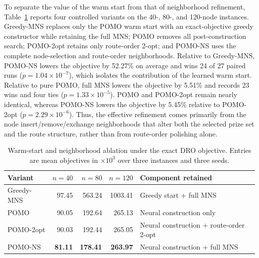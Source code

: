 \documentclass[preprint,12pt,authoryear]{elsarticle}
\theoremstyle{definition}
\begin{document}
{To separate the value of the warm start from that of neighborhood refinement, Table~\ref{tab:exact_dro_ablation} reports four controlled variants on the 40-, 80-, and 120-node instances. Greedy-MNS replaces only the POMO warm start with an exact-objective greedy constructor while retaining the full MNS; POMO removes all post-construction search; POMO-2opt retains only route-order 2-opt; and POMO-NS uses the complete node-selection and route-order neighborhoods. Relative to Greedy-MNS, POMO-NS lowers the objective by 52.27\% on average and wins 24 of 27 paired runs ($p=1.04\times10^{-7}$), which isolates the contribution of the learned warm start. Relative to pure POMO, full MNS lowers the objective by 5.51\% and records 23 wins and four ties ($p=1.33\times10^{-5}$). POMO and POMO-2opt remain nearly identical, whereas POMO-NS lowers the objective by 5.45\% relative to POMO-2opt ($p=2.29\times10^{-6}$). Thus, the effective refinement comes primarily from the node insert/remove/exchange neighborhoods that alter both the selected prize set and the route structure, rather than from route-order polishing alone.

\begin{table}[htbp]
\centering
\caption{Warm-start and neighborhood ablation under the exact DRO objective. Entries are mean objectives in $\times10^3$ over three instances and three seeds.}
\label{tab:exact_dro_ablation}
\small
\begin{tabular}{lrrrl}
\toprule
Variant & $n=40$ & $n=80$ & $n=120$ & Component retained \\
\midrule
Greedy-MNS & 97.45 & 563.24 & 1003.41 & Greedy start + full MNS \\
POMO & 90.05 & 192.64 & 265.13 & Neural construction only \\
POMO-2opt & 90.03 & 192.44 & 265.05 & Neural construction + route-order 2-opt \\
POMO-NS & \textbf{81.11} & \textbf{178.41} & \textbf{263.97} & Neural construction + full MNS \\
\bottomrule
\end{tabular}
\end{table}

}
\end{document}
